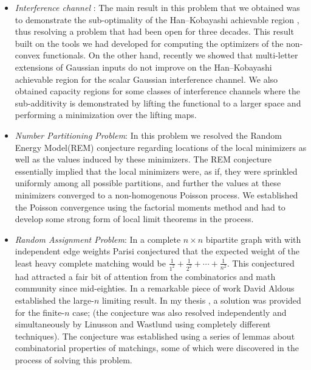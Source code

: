 \documentclass[11pt]{paper} %
\begin{document}
\begin{itemize}
\item {\it Interference channel} : The main result in this problem that we obtained was to demonstrate the sub-optimality of the Han--Kobayashi achievable region \cite{nxy15c}, thus resolving a problem that had been open for three decades. This result built on the tools we had developed for computing the optimizers of the non-convex functionals. On the other hand, recently we showed that multi-letter extensions of Gaussian inputs do not improve on the  Han--Kobayashi achievable region for the scalar Gaussian interference channel. We also obtained capacity regions for some classes of interference channels \cite{lnx14c} where the sub-additivity is demonstrated by lifting the functional to a larger space and performing a minimization over the lifting maps.

\item {\it Number Partitioning Problem}: In this problem we resolved the Random Energy Model(REM) conjecture regarding locations of the local minimizers as well as the values induced by these minimizers. The REM conjecture essentially implied that the local minimizers were, as if, they were sprinkled uniformly among all possible partitions, and further the  values at these minimizers converged to a non-homogenous Poisson process. We established the Poisson convergence \cite{bcmn09a,bcmn09b} using the factorial moments method and had to develop some strong form of local limit theorems in the process.


\item {\it Random Assignment Problem}: In a complete $n \times n$ bipartite graph with with independent edge weights Parisi \cite{par98,mep85} conjectured that the expected weight of the least heavy complete matching would be $\frac{1}{1^2} + \frac{1}{2^2} + \cdots + \frac{1}{n^2}$. This conjectured had attracted a fair bit of attention from the combinatorics and math community since mid-eighties. In a remarkable piece of work David Aldous \cite{ald01} established the large-$n$ limiting result. In my thesis \cite{npsj05,nai05}, a solution was provided for the finite-$n$ case; (the conjecture was also resolved independently and simultaneously by Linusson and Wastlund using completely different techniques). The conjecture was established using a series of lemmas about combinatorial properties of matchings, some of which were discovered in the process of solving this problem.


\end{itemize}





  
\newpage
{\small 

}
\end{document}

